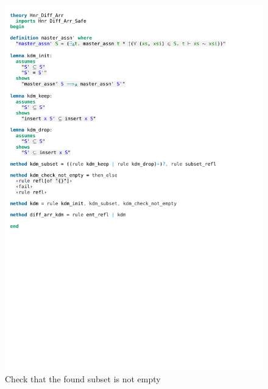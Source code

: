 \begin{figure}[htpb]
    \includegraphics[trim={0 14,2cm 0 13,6cm}, clip, width=1.00\textwidth]{figures/Theory_Hnr_Diff_Arr_KDM.pdf}
    \caption[Check that the found subset is not empty]{Check that the found subset is not empty}
    \label{fig:kdm_check_not_empty}
\end{figure}

